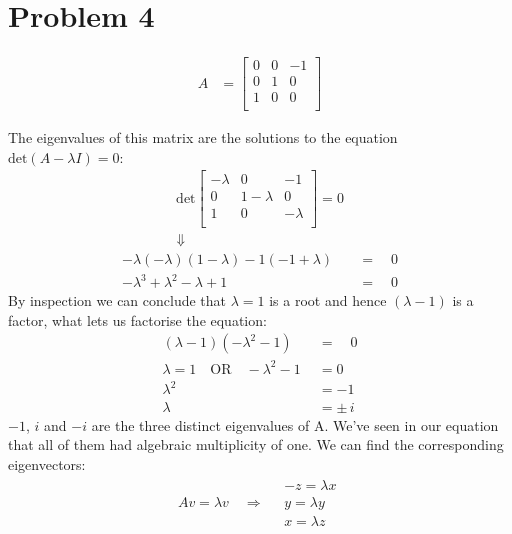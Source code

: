 \documentclass[10pt,letter]{article}
\begin{document}
\pagebreak

\section*{Problem 4}

\begin{align*}
A &=
\left[ {\begin{array}{ccc}
 0 & 0 & -1 \\
 0 &  1 & 0 \\
 1 &  0 & 0 \\
\end{array} } \right]
\end{align*}

The eigenvalues of this matrix are the solutions to the equation $\textrm{det} (A - \lambda I) = 0$:
\begin{gather*}
\textrm{det}
\left[ {\begin{array}{ccc}
 -\lambda & 0 & -1 \\
 0 &  1-\lambda & 0 \\
 1 &  0 & -\lambda \\
\end{array} } \right]
= 0
\\ \Downarrow
\end{gather*}
\begin{align*}
-\lambda(-\lambda)(1-\lambda) - 1 (-1 + \lambda)\quad  &= \quad 0
\\
-\lambda^3 + \lambda^2 - \lambda + 1 \quad &= \quad 0
\end{align*}
By inspection we can conclude that $\lambda = 1$ is a root and hence $(\lambda - 1)$ is a factor, what lets us factorise the equation:
\begin{align*}
(\lambda - 1)(-\lambda^2 -1) \quad &= \quad 0
\\
\lambda = 1 \quad \textrm{OR} \quad -\lambda^2 -1 &= 0
\\
\lambda^2 &= -1
\\
\lambda &= \pm\, i
\end{align*}
$-1$, $i$ and $-i$ are the three distinct eigenvalues of A. We've seen in our equation that all of them had algebraic multiplicity of one. We can find the corresponding eigenvectors:
\begin{gather*}
Av = \lambda v \quad \Rightarrow \quad 
\begin{aligned}
-z = \lambda x
\\
y = \lambda y
\\
x = \lambda z
\end{aligned}
\end{gather*}
\end{document}
